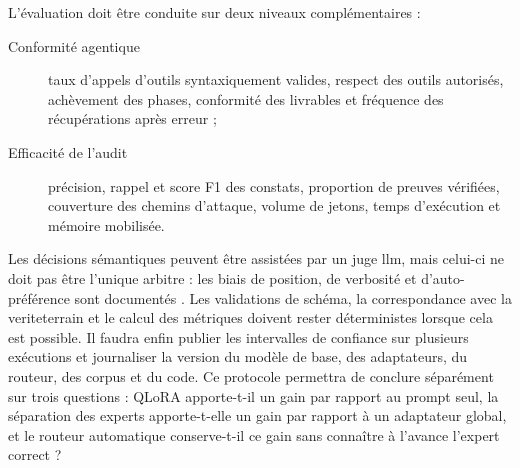 L'évaluation doit être conduite sur deux niveaux complémentaires :

\begin{description}
  \item[Conformité agentique] taux d'appels d'outils syntaxiquement valides,
    respect des outils autorisés, achèvement des phases, conformité des
    livrables et fréquence des récupérations après erreur ;
  \item[Efficacité de l'audit] précision, rappel et score F1 des constats,
    proportion de preuves vérifiées, couverture des chemins d'attaque, volume
    de jetons, temps d'exécution et mémoire mobilisée.
\end{description}

Les décisions sémantiques peuvent être assistées par un juge \gls{llm}, mais
celui-ci ne doit pas être l'unique arbitre : les biais de position, de verbosité
et d'auto-préférence sont documentés \cite{zheng2023judge}. Les validations de
schéma, la correspondance avec la \gls{veriteterrain} et le calcul des métriques
doivent rester déterministes lorsque cela est possible. Il faudra enfin publier
les intervalles de confiance sur plusieurs exécutions et journaliser la version
du modèle de base, des adaptateurs, du routeur, des corpus et du code. Ce
protocole permettra de conclure séparément sur trois questions : QLoRA
apporte-t-il un gain par rapport au prompt seul, la séparation des experts
apporte-t-elle un gain par rapport à un adaptateur global, et le routeur
automatique conserve-t-il ce gain sans connaître à l'avance l'expert correct ?
